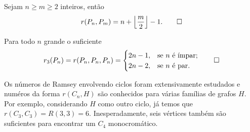 \begin{noprooftheorem}
\label{graph:thm:path}
Sejam $n \geq m \geq 2$ inteiros, então
\[r(P_n, P_m) = n + \left \lfloor \frac{m}{2} \right \rfloor - 1. \qedhere\]
\end{noprooftheorem}

\begin{noprooftheorem}
Para todo $n$ grande o suficiente
\[r_3(P_n) = r(P_n, P_n, P_n) = \begin{cases}
  2n - 1 , & \text{se } n \text{ é ímpar;} \\
  2n - 2, & \text{se } n \text{ é par.}
\end{cases} \qedhere\]
\end{noprooftheorem}

Os números de Ramsey envolvendo ciclos foram extensivamente estudados e numéros da forma $r(C_n, H)$ são conhecidos para várias famílias de grafos $H$. Por exemplo, considerando $H$ como outro ciclo, já temos que $r(C_3, C_3) = R(3,3) = 6$. Inesperadamente, seis vértices também são suficientes para encontrar um $C_4$ monocromático.

